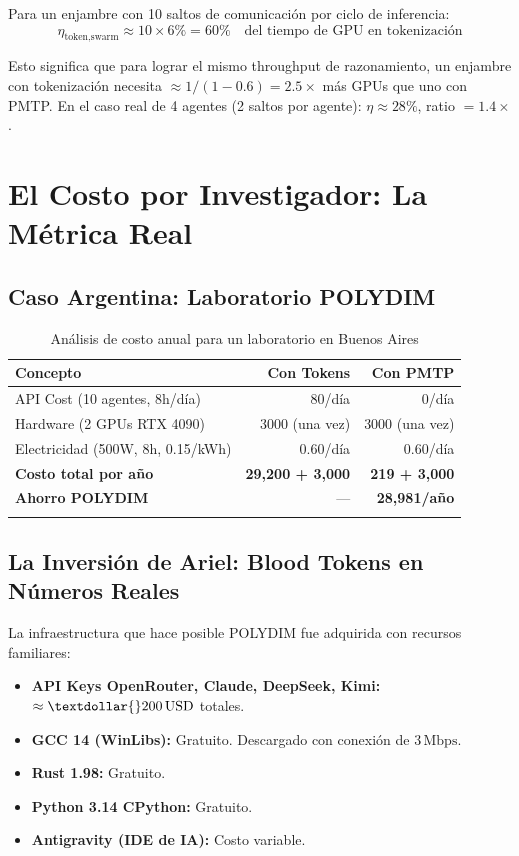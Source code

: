Para un enjambre con 10 saltos de comunicación por ciclo de inferencia:
\begin{equation}
\eta_{\text{token,swarm}} \approx 10 \times 6\% = 60\% \quad \text{del tiempo de GPU en tokenización}
\end{equation}

Esto significa que para lograr el mismo throughput de razonamiento, un enjambre
con tokenización necesita $\approx 1/(1-0.6) = 2.5\times$ más GPUs que uno con PMTP.
En el caso real de 4 agentes (2 saltos por agente): $\eta \approx 28\%$, ratio $= 1.4\times$.

\section{El Costo por Investigador: La Métrica Real}

\subsection{Caso Argentina: Laboratorio POLYDIM}

\begin{longtable}{lrr}
\toprule
\textbf{Concepto} & \textbf{Con Tokens} & \textbf{Con PMTP} \\
\midrule
API Cost (10 agentes, 8h/día) & \textdollar{}80/día & \textdollar{}0/día \\
Hardware (2 GPUs RTX 4090) & \textdollar{}3000 (una vez) & \textdollar{}3000 (una vez) \\
Electricidad (500W, 8h, \textdollar{}0.15/kWh) & \textdollar{}0.60/día & \textdollar{}0.60/día \\
\midrule
\textbf{Costo total por año} & \textbf{\textdollar{}29,200 + \textdollar{}3,000} & \textbf{\textdollar{}219 + \textdollar{}3,000} \\
\textbf{Ahorro POLYDIM} & --- & \textbf{\textdollar{}28,981/año} \\
\bottomrule
\caption{Análisis de costo anual para un laboratorio en Buenos Aires}
\label{tab:costo_latam}
\end{longtable}

\subsection{La Inversión de Ariel: Blood Tokens en Números Reales}

La infraestructura que hace posible POLYDIM fue adquirida con recursos familiares:
\begin{itemize}
\item \textbf{API Keys OpenRouter, Claude, DeepSeek, Kimi:} $\approx \textdollar{}200\,\text{USD}$ totales.
\item \textbf{GCC 14 (WinLibs):} Gratuito. Descargado con conexión de $3\,\text{Mbps}$.
\item \textbf{Rust 1.98:} Gratuito.
\item \textbf{Python 3.14 CPython:} Gratuito.
\item \textbf{Antigravity (IDE de IA):} Costo variable.
\end{itemize}

